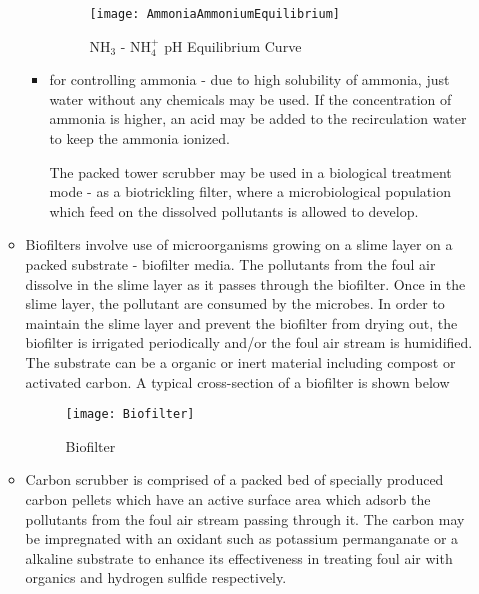 \begin{itemize}
\begin{itemize}
\begin{itemize}
\begin{figure}
	\end{figure}
	
\begin{figure}
	\begin{center}
		\texttt{[image: AmmoniaAmmoniumEquilibrium]}
			\caption{NH$_3$ - NH$_4^+$ pH Equilibrium Curve}
	\end{center}
	
	\end{figure}	


			\item for controlling ammonia - due to high solubility of ammonia, just water without any chemicals may be used.  If the concentration of ammonia is higher, an acid may be added to the recirculation water to keep the ammonia ionized.

The packed tower scrubber may be used in a biological treatment mode - as a biotrickling filter, where a microbiological population which feed on the dissolved pollutants is allowed to develop. 
 	\end{itemize}
 		\item Biofilters involve use of microorganisms growing on a slime layer on a packed substrate - biofilter media.  The pollutants from the foul air dissolve in the slime layer as it passes through the biofilter.  Once in the slime layer, the pollutant are consumed by the microbes.  In order to maintain the slime layer and prevent the biofilter from drying out, the biofilter is irrigated periodically and/or the foul air stream is humidified.  The substrate can be a organic or inert material including compost or activated carbon.  A typical cross-section of a biofilter is shown below


\begin{figure}
	\begin{center}
		\texttt{[image: Biofilter]}
			\caption{Biofilter}
	\end{center}
	
	\end{figure}

		\item Carbon scrubber is comprised of a  packed bed of specially produced carbon pellets which have an active surface area which adsorb the pollutants from the foul air stream passing through it. The carbon may be impregnated with an oxidant such as potassium permanganate or a alkaline substrate to enhance its effectiveness in treating foul air with organics and hydrogen sulfide respectively.
\end{itemize}
\end{itemize}


